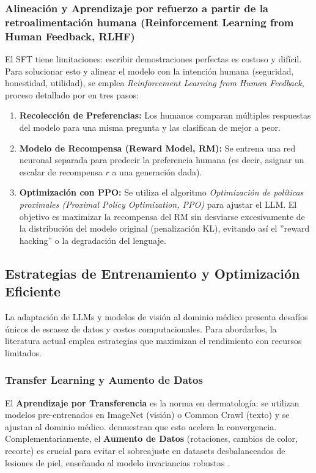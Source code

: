 \documentclass[11pt, a4paper]{article}
\begin{document}
\subsubsection{Alineación y Aprendizaje por refuerzo a partir de la retroalimentación humana (Reinforcement Learning from Human Feedback, RLHF)}
El SFT tiene limitaciones: escribir demostraciones perfectas es costoso y difícil. Para solucionar esto y alinear el modelo con la intención humana (seguridad, honestidad, utilidad), se emplea 
\textit{Reinforcement Learning from Human Feedback}, proceso detallado por \cite{ouyang_training_nodate} en tres pasos:
\begin{enumerate}
    \item \textbf{Recolección de Preferencias:} Los humanos comparan múltiples respuestas del modelo para una misma pregunta y las clasifican de mejor a peor.
    \item \textbf{Modelo de Recompensa (Reward Model, RM):} Se entrena una red neuronal separada para predecir la preferencia humana (es decir, asignar un escalar de recompensa $r$ a una 
    generación dada).
    \item \textbf{Optimización con PPO:} Se utiliza el algoritmo \textit{Optimización de políticas proximales (Proximal Policy Optimization, PPO)} para ajustar el LLM. El objetivo es maximizar la recompensa
    del RM sin desviarse excesivamente de la distribución del modelo original (penalización KL), evitando así el ''reward hacking'' o la degradación del lenguaje.
\end{enumerate}

\subsection{Estrategias de Entrenamiento y Optimización Eficiente}

La adaptación de LLMs y modelos de visión al dominio médico presenta desafíos únicos de escasez de datos y costos computacionales. Para abordarlos, la literatura actual emplea estrategias que maximizan el rendimiento con recursos limitados.

\subsubsection{Transfer Learning y Aumento de Datos}
El \textbf{Aprendizaje por Transferencia} es la norma en dermatología: se utilizan modelos pre-entrenados en ImageNet (visión) o Common Crawl (texto) y se ajustan al dominio médico. \cite{pan_survey_2010} demuestran
que esto acelera la convergencia. Complementariamente, el \textbf{Aumento de Datos} (rotaciones, cambios de color, recorte) es crucial para evitar el sobreajuste en datasets desbalanceados de lesiones de piel, enseñando al
modelo invariancias robustas \cite{shorten_survey_2019}.
\end{document}
